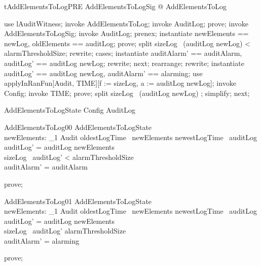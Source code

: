\begin{theorem}{tAddElementsToLogPRE}
\forall  AddElementsToLogSig @ \pre  AddElementsToLog
\end{theorem}

\begin{zproof}[tAddElementsToLogPRE]
use lAuditWitness;
invoke AddElementsToLog;
invoke \Delta AuditLog;
prove;
invoke AddElementsToLogSig;
invoke AuditLog;
prenex;
instantiate newElements == newLog, oldElements == auditLog;
prove;
split sizeLog~ (auditLog \cup  newLog) < alarmThresholdSize;
rewrite;
cases;
instantiate auditAlarm' == auditAlarm, auditLog' == auditLog \cup  newLog;
rewrite;
next;
rearrange;
rewrite;
instantiate auditLog' == auditLog \cup  newLog, auditAlarm' == alarming;
use applyInRanFun[\finset  Audit, TIME][f := sizeLog, a := auditLog \cup  newLog];
invoke Config;
invoke TIME;
prove;
split sizeLog~ (auditLog \cup  newLog) ;
simplify;
next;
\end{zproof}

\begin{zed}
AddElementsToLogState  Config \land  \Delta AuditLog
\end{zed}

\begin{schema}{AddElementsToLog00}
  AddElementsToLogState\\
  newElements: \finset _1{} Audit
\where
  oldestLogTime~ newElements \geq  newestLogTime~ auditLog\\
  auditLog' = auditLog \cup  newElements\\
  sizeLog~ auditLog' < alarmThresholdSize\\
  auditAlarm' = auditAlarm
\end{schema}

\begin{zproof}
prove;
\end{zproof}

\begin{schema}{AddElementsToLog01}
  AddElementsToLogState\\
  newElements: \finset _1{} Audit
\where
  oldestLogTime~ newElements \geq  newestLogTime~ auditLog\\
  auditLog' = auditLog \cup  newElements\\
  sizeLog~ auditLog' \geq  alarmThresholdSize\\
  auditAlarm' = alarming
\end{schema}

\begin{zproof}
prove;
\end{zproof}


